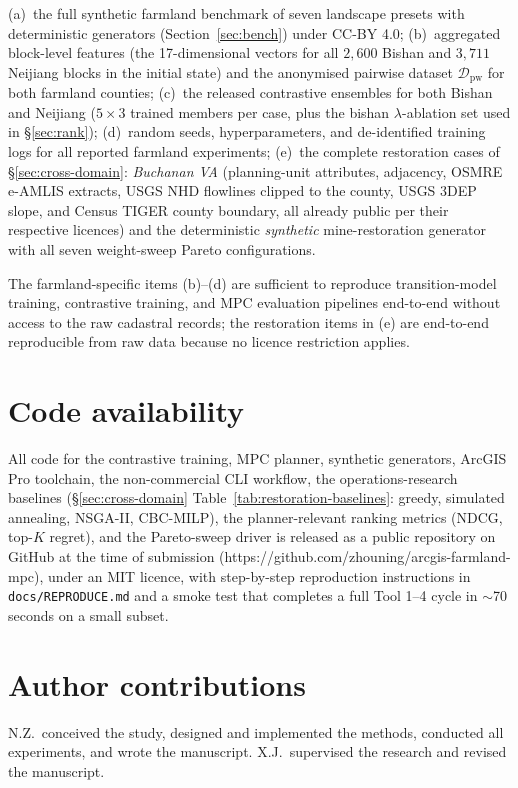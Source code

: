 \documentclass[11pt]{article}
\begin{document}
(a)~the full synthetic farmland benchmark of seven landscape presets with deterministic generators (Section~\ref{sec:bench}) under CC-BY 4.0;
(b)~aggregated block-level features (the 17-dimensional vectors for all $2{,}600$ Bishan and $3{,}711$ Neijiang blocks in the initial state) and the anonymised pairwise dataset $\mathcal{D}_{\text{pw}}$ for both farmland counties;
(c)~the released contrastive ensembles for both Bishan and Neijiang ($5 \times 3$ trained members per case, plus the bishan $\lambda$-ablation set used in \S\ref{sec:rank});
(d)~random seeds, hyperparameters, and de-identified training logs for all reported farmland experiments;
(e)~the complete restoration cases of \S\ref{sec:cross-domain}: \emph{Buchanan VA} (planning-unit attributes, adjacency, OSMRE e-AMLIS extracts, USGS NHD flowlines clipped to the county, USGS 3DEP slope, and Census TIGER county boundary, all already public per their respective licences) and the deterministic \emph{synthetic} mine-restoration generator with all seven weight-sweep Pareto configurations.

The farmland-specific items (b)--(d) are sufficient to reproduce transition-model training, contrastive training, and MPC evaluation pipelines end-to-end without access to the raw cadastral records; the restoration items in (e) are end-to-end reproducible from raw data because no licence restriction applies.

\section*{Code availability}
All code for the contrastive training, MPC planner, synthetic generators, ArcGIS Pro toolchain, the non-commercial CLI workflow, the operations-research baselines (\S\ref{sec:cross-domain} Table~\ref{tab:restoration-baselines}: greedy, simulated annealing, NSGA-II, CBC-MILP), the planner-relevant ranking metrics (NDCG, top-$K$ regret), and the Pareto-sweep driver is released as a public repository on GitHub at the time of submission (https://github.com/zhouning/arcgis-farmland-mpc), under an MIT licence, with step-by-step reproduction instructions in \texttt{docs/REPRODUCE.md} and a smoke test that completes a full Tool 1--4 cycle in $\sim$70 seconds on a small subset.

\section*{Author contributions}
N.Z.\ conceived the study, designed and implemented the methods, conducted all experiments, and wrote the manuscript. X.J.\ supervised the research and revised the manuscript.
\end{document}
